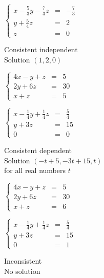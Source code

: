 \documentclass{ximera}
\begin{document}
\begin{question}
\begin{problem}
\begin{solution}
$\left\{ \begin{array}{rcr} x - \frac{5}{3}y - \frac{7}{3}z & = & -\frac{7}{3} \\   y + \frac{5}{4}z & = & 2 \\ z & = & 0  \end{array} \right.$

Consistent independent\\
Solution $(1, 2, 0)$
\end{solution}
\end{problem}

\begin{problem}\label{dependentsystemmuliple}
$\left\{ \begin{array}{rcr} 4x - y + z & = & 5 \\ 2y + 6z & = & 30 \\ x + z & = & 5  \end{array} \right.$

\begin{solution}
$\left\{ \begin{array}{rcr} x - \frac{1}{4}y + \frac{1}{4}z & = & \frac{5}{4} \\   y + 3z & = & 15 \\ 0 & = & 0  \end{array} \right.$

Consistent dependent\\
Solution $(-t + 5, -3t + 15, t)$\\
for all real numbers $t$
\end{solution}
\end{problem}

\begin{problem}
$\left\{ \begin{array}{rcr} 4x - y + z & = & 5 \\ 2y + 6z & = & 30 \\ x + z & = & 6  \end{array} \right.$

\begin{solution}
$\left\{ \begin{array}{rcr} x - \frac{1}{4}y + \frac{1}{4}z & = & \frac{5}{4} \\   y + 3z & = & 15 \\ 0 & = & 1 \end{array} \right.$

Inconsistent\\
No solution
\end{solution}
\end{problem}


\end{question}
\end{document}
